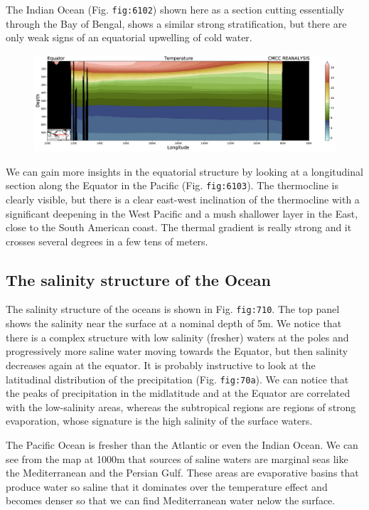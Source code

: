 The Indian Ocean (Fig. \texttt{fig:6102}) shown here as a section
cutting essentially through the Bay of Bengal, shows a similar strong
stratification, but there are only weak signs of an equatorial upwelling
of cold water.

\begin{figure}
\centering
\includegraphics[width = .7 \textwidth]{figs/GD/SectEquator1000.png}
\caption{} \label{fig:}
\end{figure}

We can gain more insights in the equatorial structure by looking at a
longitudinal section along the Equator in the Pacific (Fig.
\texttt{fig:6103}). The thermocline is clearly visible, but there is a
clear east-west inclination of the thermocline with a significant
deepening in the West Pacific and a mush shallower layer in the East,
close to the South American coast. The thermal gradient is really strong
and it crosses several degrees in a few tens of meters.

\subsection{The salinity structure of the
Ocean}\label{the-salinity-structure-of-the-ocean}

The salinity structure of the oceans is shown in Fig. \texttt{fig:710}.
The top panel shows the salinity near the surface at a nominal depth of
5m. We notice that there is a complex structure with low salinity
(fresher) waters at the poles and progressively more saline water moving
towards the Equator, but then salinity decreases again at the equator.
It is probably instructive to look at the latitudinal distribution of
the precipitation (Fig. \texttt{fig:70a}). We can notice that the peaks
of precipitation in the midlatitude and at the Equator are correlated
with the low-salinity areas, whereas the subtropical regions are regions
of strong evaporation, whose signature is the high salinity of the
surface waters.

The Pacific Ocean is fresher than the Atlantic or even the Indian Ocean.
We can see from the map at 1000m that sources of saline waters are
marginal seas like the Mediterranean and the Persian Gulf. These areas
are evaporative basins that produce water so saline that it dominates
over the temperature effect and becomes denser so that we can find
Mediterranean water nelow the surface.

